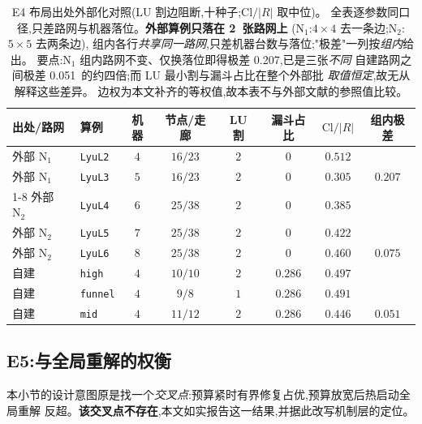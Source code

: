 \documentclass[manuscript,screen,review]{acmart}
\newcommand{\NPubNets}{2}
\newcommand{\PubCloSpread}{0.207}
\newcommand{\PubCloSpreadBig}{0.075}
\newcommand{\SelfCloSpread}{0.051}
\begin{document}
\begin{table}[t]
\centering
\caption{E4 布局出处外部化对照(LU 割边阻断,十种子;\(\mathrm{Cl}/|R|\) 取中位)。
全表逐参数同口径,只差路网与机器落位。\textbf{外部算例只落在 \NPubNets\ 张路网上}
(\(\mathrm{N}_1\):\(4\times 4\) 去一条边;\(\mathrm{N}_2\):\(5\times 5\) 去两条边),
组内各行\emph{共享同一路网},只差机器台数与落位;"极差"一列按\emph{组内}给出。
要点:\(\mathrm{N}_1\) 组内路网不变、仅换落位即得极差 \PubCloSpread,已是三张\emph{不同}
自建路网之间极差 \SelfCloSpread\ 的约四倍;而 LU 最小割与漏斗占比在整个外部批
\emph{取值恒定},故无从解释这些差异。
边权为本文补齐的等权值,故本表不与外部文献的参照值比较。}
\label{tab:e4pub}
\small
\begin{tabular}{@{}llcccccc@{}}
\toprule
出处/路网 & 算例 & 机器 & 节点/走廊 & LU 割 & 漏斗占比 & \(\mathrm{Cl}/|R|\)
 & 组内极差 \\
\midrule
外部 \(\mathrm{N}_1\) & \texttt{LyuL2} & \(4\) & \(16/23\) & \(2\) & \(0\) & \(0.512\) & \\
外部 \(\mathrm{N}_1\) & \texttt{LyuL3} & \(5\) & \(16/23\) & \(2\) & \(0\) & \(0.305\)
  & \(\PubCloSpread\) \\
\cmidrule{1-8}
外部 \(\mathrm{N}_2\) & \texttt{LyuL4} & \(6\) & \(25/38\) & \(2\) & \(0\) & \(0.385\) & \\
外部 \(\mathrm{N}_2\) & \texttt{LyuL5} & \(7\) & \(25/38\) & \(2\) & \(0\) & \(0.422\) & \\
外部 \(\mathrm{N}_2\) & \texttt{LyuL6} & \(8\) & \(25/38\) & \(2\) & \(0\) & \(0.460\)
  & \(\PubCloSpreadBig\) \\
\midrule
自建 & \texttt{high} & \(4\) & \(10/10\) & \(2\) & \(0.286\) & \(0.497\) & \\
自建 & \texttt{funnel} & \(4\) & \(9/8\) & \(1\) & \(0.286\) & \(0.491\) & \\
自建 & \texttt{mid} & \(4\) & \(11/12\) & \(2\) & \(0.286\) & \(0.446\)
  & \(\SelfCloSpread\) \\
\bottomrule
\end{tabular}
\end{table}

\subsection{E5:与全局重解的权衡}
\label{sec:e5}

本小节的设计意图原是找一个\emph{交叉点}:预算紧时有界修复占优,预算放宽后热启动全局重解
反超。\textbf{该交叉点不存在},本文如实报告这一结果,并据此改写机制层的定位。
\end{document}
